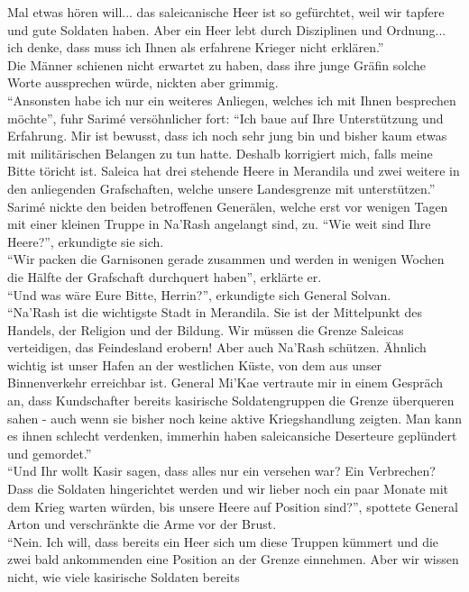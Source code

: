 Mal etwas hören will... das saleicanische Heer ist so gefürchtet, weil wir tapfere und gute 
Soldaten haben. Aber ein Heer lebt durch Disziplinen und Ordnung... ich denke, dass muss ich Ihnen 
als erfahrene Krieger nicht erklären.''\\
Die Männer schienen nicht erwartet zu haben, dass ihre junge Gräfin solche Worte aussprechen würde, 
nickten aber grimmig.\\
``Ansonsten habe ich nur ein weiteres Anliegen, welches ich mit Ihnen besprechen möchte'', fuhr 
Sarimé versöhnlicher fort: ``Ich baue auf Ihre Unterstützung und Erfahrung. Mir ist bewusst, dass 
ich noch sehr jung bin und bisher kaum etwas mit militärischen Belangen zu tun hatte. Deshalb 
korrigiert mich, falls meine Bitte töricht ist. Saleica hat drei stehende Heere in Merandila und 
zwei weitere in den anliegenden Grafschaften, welche unsere Landesgrenze mit unterstützen.''\\
Sarimé nickte den beiden betroffenen Generälen, welche erst vor wenigen Tagen mit einer kleinen 
Truppe in Na'Rash angelangt sind, zu. ``Wie weit sind Ihre Heere?'', erkundigte sie sich.\\
``Wir packen die Garnisonen gerade zusammen und werden in wenigen Wochen die Hälfte der Grafschaft 
durchquert haben'', erklärte er.\\
``Und was wäre Eure Bitte, Herrin?'', erkundigte sich General Solvan.\\
``Na'Rash ist die wichtigste Stadt in Merandila. Sie ist der Mittelpunkt des Handels, der Religion 
und der Bildung. Wir müssen die Grenze Saleicas verteidigen, das Feindesland erobern! Aber auch 
Na'Rash schützen. Ähnlich wichtig ist unser Hafen an der westlichen Küste, von dem aus unser 
Binnenverkehr erreichbar ist. General Mi'Kae vertraute mir in einem Gespräch an, dass Kundschafter 
bereits kasirische Soldatengruppen die Grenze überqueren sahen - auch wenn sie bisher noch keine 
aktive Kriegshandlung zeigten. Man kann es ihnen schlecht verdenken, immerhin haben saleicansiche 
Deserteure geplündert und gemordet.''\\
``Und Ihr wollt Kasir sagen, dass alles nur ein versehen war? Ein Verbrechen? Dass die Soldaten 
hingerichtet werden und wir lieber noch ein paar Monate mit dem Krieg warten würden, bis unsere 
Heere auf Position sind?'', spottete General Arton und verschränkte die Arme vor der Brust.\\
``Nein. Ich will, dass bereits ein Heer sich um diese Truppen kümmert und die zwei bald ankommenden 
eine Position an der Grenze einnehmen. Aber wir wissen nicht, wie viele kasirische Soldaten bereits 
